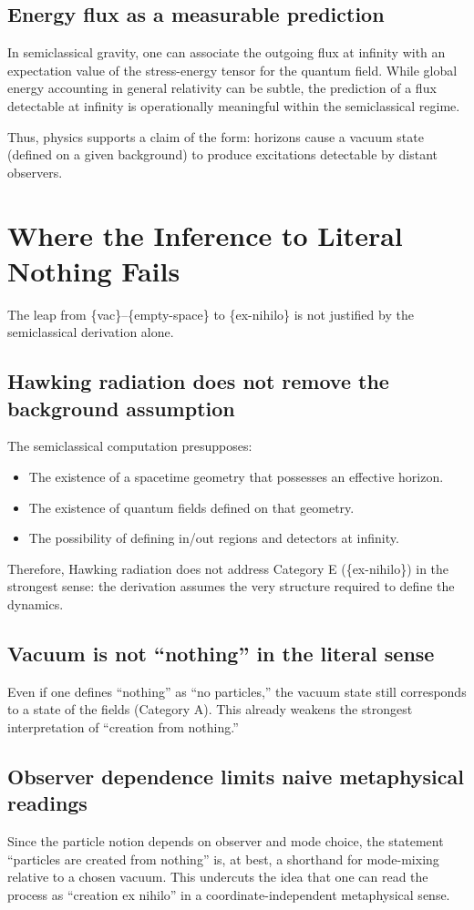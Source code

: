 \documentclass[11pt,a4paper]{article}
\begin{document}
\subsection{Energy flux as a measurable prediction}
In semiclassical gravity, one can associate the outgoing flux at infinity with an expectation value of the stress-energy tensor for the quantum field. While global energy accounting in general relativity can be subtle, the prediction of a flux detectable at infinity is operationally meaningful within the semiclassical regime.

Thus, physics supports a claim of the form: horizons cause a vacuum state (defined on a given background) to produce excitations detectable by distant observers.

\section{Where the Inference to Literal Nothing Fails}
The leap from \{vac\}--\{empty-space\} to \{ex-nihilo\} is not justified by the semiclassical derivation alone.

\subsection{Hawking radiation does not remove the background assumption}
The semiclassical computation presupposes:
\begin{itemize}[leftmargin=2em]
\item The existence of a spacetime geometry that possesses an effective horizon.
\item The existence of quantum fields defined on that geometry.
\item The possibility of defining in/out regions and detectors at infinity.
\end{itemize}
Therefore, Hawking radiation does not address Category E (\{ex-nihilo\}) in the strongest sense: the derivation assumes the very structure required to define the dynamics.

\subsection{Vacuum is not ``nothing'' in the literal sense}
Even if one defines ``nothing'' as ``no particles,'' the vacuum state still corresponds to a state of the fields (Category A). This already weakens the strongest interpretation of ``creation from nothing.''

\subsection{Observer dependence limits naive metaphysical readings}
Since the particle notion depends on observer and mode choice, the statement ``particles are created from nothing'' is, at best, a shorthand for mode-mixing relative to a chosen vacuum. This undercuts the idea that one can read the process as ``creation ex nihilo'' in a coordinate-independent metaphysical sense.
\end{document}
